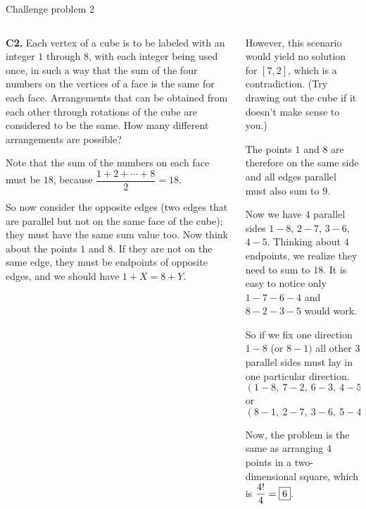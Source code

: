 \documentclass[9pt,aspectratio=169]{beamer}
\begin{document}
\begin{frame}{Challenge problem 2}
  \begin{columns}[T]
    \begin{column}{0.5\textwidth}
      \begin{problem}
        \textbf{C2.} Each vertex of a cube is to be labeled with an integer $1$ through $8$, with each integer being used once, in such a way that the sum of the four numbers on the vertices of a face is the same for each face. Arrangements that can be obtained from each other through rotations of the cube are considered to be the same. How many different arrangements are possible?
      \end{problem}
      Note that the sum of the numbers on each face must be $18$, because $\dfrac{1+2+\cdots+8}{2}=18$.

      So now consider the opposite edges (two edges that are parallel but not on the same face of the cube); they must have the same sum value too. Now think about the points $1$ and $8$. If they are not on the same edge, they must be endpoints of opposite edges, and we should have $1+X=8+Y$.

    \end{column}
    \begin{column}{0.5\textwidth}
      However, this scenario would yield no solution for $[7,2]$, which is a contradiction. (Try drawing out the cube if it doesn't make sense to you.)
    
      The points $1$ and $8$ are therefore on the same side and all edges parallel must also sum to $9$.

      Now we have $4$ parallel sides $1-8$, $2-7$, $3-6$, $4-5$. Thinking about $4$ endpoints, we realize they need to sum to $18$. It is easy to notice only $1-7-6-4$ and $8-2-3-5$ would work.

      So if we fix one direction $1-8$ (or $8-1)$ all other $3$ parallel sides must lay in one particular direction. $(1-8,\ 7-2,\ 6-3,\ 4-5)$ or $(8-1,\ 2-7,\ 3-6,\ 5-4)$

      Now, the problem is the same as arranging $4$ points in a two-dimensional square, which is $\dfrac{4!}{4}=\fbox{6}$.
    \end{column}
  \end{columns}
\end{frame}
\end{document}
